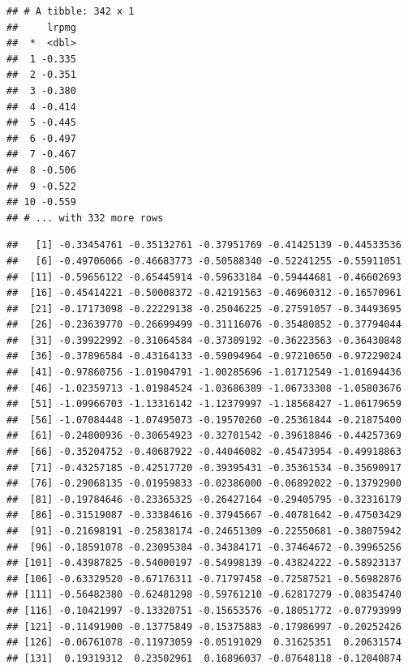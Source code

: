 \documentclass[]{gitbook}
\newenvironment{Shaded}{\begin{snugshade}}{\end{snugshade}}
\newcommand{\KeywordTok}[1]{\textcolor[rgb]{0.13,0.29,0.53}{\textbf{#1}}}
\newcommand{\NormalTok}[1]{#1}
\newcommand{\OperatorTok}[1]{\textcolor[rgb]{0.81,0.36,0.00}{\textbf{#1}}}
\newcommand{\StringTok}[1]{\textcolor[rgb]{0.31,0.60,0.02}{#1}}
\theoremstyle{definition}
\theoremstyle{definition}
\theoremstyle{definition}
\theoremstyle{remark}
\begin{document}
\begin{verbatim}
## # A tibble: 342 x 1
##     lrpmg
##  *  <dbl>
##  1 -0.335
##  2 -0.351
##  3 -0.380
##  4 -0.414
##  5 -0.445
##  6 -0.497
##  7 -0.467
##  8 -0.506
##  9 -0.522
## 10 -0.559
## # ... with 332 more rows
\end{verbatim}

\begin{Shaded}
\end{Shaded}

\begin{verbatim}
##   [1] -0.33454761 -0.35132761 -0.37951769 -0.41425139 -0.44533536
##   [6] -0.49706066 -0.46683773 -0.50588340 -0.52241255 -0.55911051
##  [11] -0.59656122 -0.65445914 -0.59633184 -0.59444681 -0.46602693
##  [16] -0.45414221 -0.50008372 -0.42191563 -0.46960312 -0.16570961
##  [21] -0.17173098 -0.22229138 -0.25046225 -0.27591057 -0.34493695
##  [26] -0.23639770 -0.26699499 -0.31116076 -0.35480852 -0.37794044
##  [31] -0.39922992 -0.31064584 -0.37309192 -0.36223563 -0.36430848
##  [36] -0.37896584 -0.43164133 -0.59094964 -0.97210650 -0.97229024
##  [41] -0.97860756 -1.01904791 -1.00285696 -1.01712549 -1.01694436
##  [46] -1.02359713 -1.01984524 -1.03686389 -1.06733308 -1.05803676
##  [51] -1.09966703 -1.13316142 -1.12379997 -1.18568427 -1.06179659
##  [56] -1.07084448 -1.07495073 -0.19570260 -0.25361844 -0.21875400
##  [61] -0.24800936 -0.30654923 -0.32701542 -0.39618846 -0.44257369
##  [66] -0.35204752 -0.40687922 -0.44046082 -0.45473954 -0.49918863
##  [71] -0.43257185 -0.42517720 -0.39395431 -0.35361534 -0.35690917
##  [76] -0.29068135 -0.01959833 -0.02386000 -0.06892022 -0.13792900
##  [81] -0.19784646 -0.23365325 -0.26427164 -0.29405795 -0.32316179
##  [86] -0.31519087 -0.33384616 -0.37945667 -0.40781642 -0.47503429
##  [91] -0.21698191 -0.25838174 -0.24651309 -0.22550681 -0.38075942
##  [96] -0.18591078 -0.23095384 -0.34384171 -0.37464672 -0.39965256
## [101] -0.43987825 -0.54000197 -0.54998139 -0.43824222 -0.58923137
## [106] -0.63329520 -0.67176311 -0.71797458 -0.72587521 -0.56982876
## [111] -0.56482380 -0.62481298 -0.59761210 -0.62817279 -0.08354740
## [116] -0.10421997 -0.13320751 -0.15653576 -0.18051772 -0.07793999
## [121] -0.11491900 -0.13775849 -0.15375883 -0.17986997 -0.20252426
## [126] -0.06761078 -0.11973059 -0.05191029  0.31625351  0.20631574
## [131]  0.19319312  0.23502961  0.16896037 -0.07648118 -0.12040874

\end{verbatim}
\end{document}
